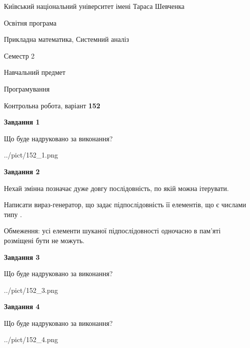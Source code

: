 \documentclass[12pt, ukrainian]{article}
\begin{document}
{{\begin {small}\par
{ \center  Київський національний університет імені Тараса Шевченка \par}
{\parbox {5 cm}{Освітня програма \hfill}{\parbox {8 cm}{Прикладна математика, Системний аналіз \hfill}}\parbox {5 cm}{\hfill Семестр 2}}\par
{\parbox {5 cm} {Навчальний предмет \hfill}\parbox {7 cm}{Програмування \hfill}\parbox {6cm}{\hfill}\par}\vspace{-7pt} \end{small}}{\center Контрольна робота, варіант  \No \textbf
{ 152 }\par}}
{
\begin {large}
{\begin {center}\textbf{Завдання 1}\end {center}}\par
Що буде надруковано за виконання?\par\par
\begin{center}
	{../pict/152_1.png}
\end{center}
\newpage

{\begin {center}\textbf{Завдання 2}\end {center}}\par
Нехай змінна  позначає дуже довгу послідовність, по якій можна ітерувати.

Написати вираз-генератор, що задає підпослідовність її елементів, що є числами типу .

Обмеження: усі елементи шуканої підпослідовності одночасно в пам'яті розміщені бути не можуть.\par
\newpage

{\begin {center}\textbf{Завдання 3}\end {center}}\par
Що буде надруковано за виконання?\par
\begin{center}
	{../pict/152_3.png}
\end{center}
\newpage

{\begin {center}\textbf{Завдання 4}\end {center}}\par
Що буде надруковано за виконання?\par
\begin{center}
	{../pict/152_4.png}
\end{center}
\newpage


\end{large}}
\end{document}
